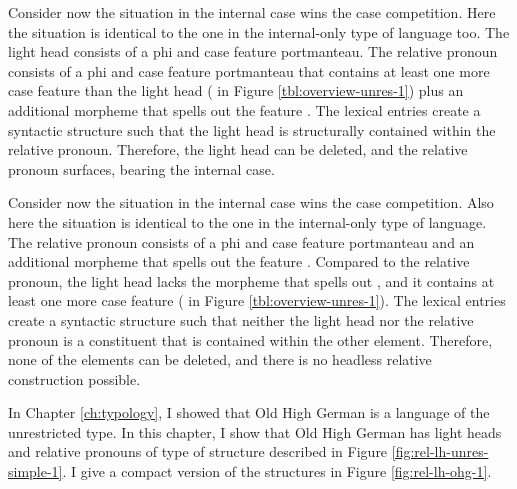 Consider now the situation in the internal case wins the case competition. Here the situation is identical to the one in the internal-only type of language too. The light head consists of a phi and case feature portmanteau. The relative pronoun consists of a phi and case feature portmanteau that contains at least one more case feature than the light head ( in Figure \ref{tbl:overview-unres-1}) plus an additional morpheme that spells out the feature . The lexical entries create a syntactic structure such that the light head is structurally contained within the relative pronoun. Therefore, the light head can be deleted, and the relative pronoun surfaces, bearing the internal case.

Consider now the situation in the internal case wins the case competition. Also here the situation is identical to the one in the internal-only type of language. The relative pronoun consists of a phi and case feature portmanteau and an additional morpheme that spells out the feature . Compared to the relative pronoun, the light head lacks the morpheme that spells out , and it contains at least one more case feature ( in Figure \ref{tbl:overview-unres-1}). The lexical entries create a syntactic structure such that neither the light head nor the relative pronoun is a constituent that is contained within the other element. Therefore, none of the elements can be deleted, and there is no headless relative construction possible.

In Chapter \ref{ch:typology}, I showed that Old High German is a language of the unrestricted type. In this chapter, I show that Old High German has light heads and relative pronouns of type of structure described in Figure \ref{fig:rel-lh-unres-simple-1}. I give a compact version of the structures in Figure \ref{fig:rel-lh-ohg-1}.

